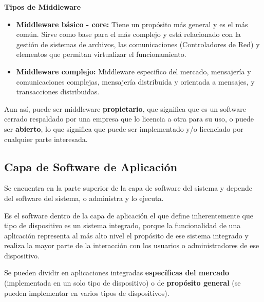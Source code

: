 \documentclass[12pt, twoside, openright]{report} %
\begin{document}
\textbf{Tipos de Middleware}
\begin{itemize}
	\item \textbf{Middleware básico - core:} Tiene un propósito más general y es el más común. Sirve como base para el más complejo y está relacionado con la gestión de sistemas de archivos, las comunicaciones (Controladores de Red) y elementos que permitan virtualizar el funcionamiento.
	\item \textbf{Middleware complejo:} Middleware especifico del mercado, mensajería y comunicaciones complejas, mensajería distribuida y orientada a mensajes, y transacciones distribuidas.
\end{itemize}

Aun así, puede ser middleware \textbf{propietario}, que significa que es un software cerrado respaldado por una empresa que lo licencia a otra para su uso, o puede ser \textbf{abierto}, lo que significa que puede ser implementado y/o licenciado por cualquier parte interesada.

\subsection{Capa de Software de Aplicación}
Se encuentra en la parte superior de la capa de software del sistema y depende del software del sistema, o administra y lo ejecuta.

Es el software dentro de la capa de aplicación el que define inherentemente que tipo de dispositivo es un sistema integrado, porque la funcionalidad de una aplicación representa al más alto nivel el propósito de ese sistema integrado y realiza la mayor parte de la interacción con los usuarios o administradores de ese dispositivo.

Se pueden dividir en aplicaciones integradas \textbf{específicas del mercado} (implementada en un solo tipo de dispositivo) o de \textbf{propósito general} (se pueden implementar en varios tipos de dispositivos).
\pagebreak
\end{document}
